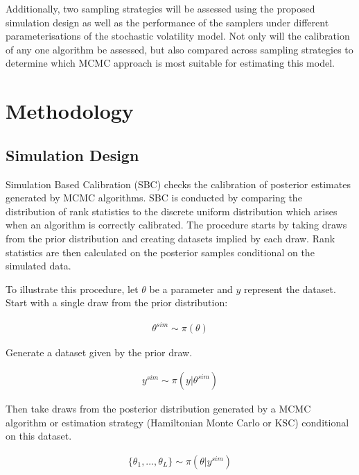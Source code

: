 \documentclass[12pt, a4paper]{article}
\begin{document}
    Additionally, two sampling strategies will be assessed using the proposed simulation design as well as the performance of the samplers under different parameterisations of the stochastic volatility model. Not only will the calibration of any one algorithm be assessed, but also compared across sampling strategies to determine which MCMC approach is most suitable for estimating this model. 

\section{Methodology}

    \subsection{Simulation Design}
        Simulation Based Calibration (SBC) checks the calibration of posterior estimates generated by MCMC algorithms. SBC is conducted by comparing the distribution of rank statistics to the discrete uniform distribution which arises when an algorithm is correctly calibrated. The procedure starts by taking draws from the prior distribution and creating datasets implied by each draw. Rank statistics are then calculated on the posterior samples conditional on the simulated data. 

        To illustrate this procedure, let $\theta$ be a parameter and $y$ represent the dataset. Start with a single draw from the prior distribution:
        
        $$
        \begin{aligned}
        \theta^{sim} \sim \pi(\theta)
        \end{aligned}
        $$

        Generate a dataset given by the prior draw.

        $$
        \begin{aligned}
        y^{sim} \sim \pi (y|\theta^{sim})
        \end{aligned}
        $$

        Then take draws from the posterior distribution generated by a MCMC algorithm or estimation strategy (Hamiltonian Monte Carlo or KSC) conditional on this dataset.

        $$
        \begin{aligned}
        \{\theta_1,\dots , \theta_{L}\} \sim \pi (\theta | y^{sim})
        \end{aligned}
        $$
\end{document}
